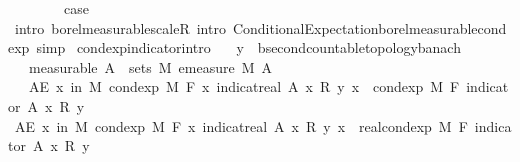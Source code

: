 \begin{isabellebody}
\isanewline
\ \ \isamarkupfalse%
\ {}\isanewline
\ \ \isamarkupfalse%
\ {\isacharquery}{\kern0pt}case\ \isamarkupfalse%
\ {\isacharparenleft}{\kern0pt}intro\ borel{\isacharunderscore}{\kern0pt}measurable{\isacharunderscore}{\kern0pt}scaleR{\isacharcomma}{\kern0pt}\ intro\ Conditional{\isacharunderscore}{\kern0pt}Expectation{\isachardot}{\kern0pt}borel{\isacharunderscore}{\kern0pt}measurable{\isacharunderscore}{\kern0pt}cond{\isacharunderscore}{\kern0pt}exp{\isacharcomma}{\kern0pt}\ simp{\isacharparenright}{\kern0pt}\isanewline
{}\isamarkupfalse%
%
\endisatagproof
{\isafoldproof}%
%
\isadelimproof
\isanewline
%
\endisadelimproof
\isanewline
{}\isamarkupfalse%
\ cond{\isacharunderscore}{\kern0pt}exp{\isacharunderscore}{\kern0pt}indicator{\isacharbrackleft}{\kern0pt}intro{\isacharbrackright}{\kern0pt}{\isacharcolon}{\kern0pt}\isanewline
\ \ \ y\ {\isacharcolon}{\kern0pt}{\isacharcolon}{\kern0pt}\ {\isachardoublequoteopen}{\isacharprime}{\kern0pt}b{\isacharcolon}{\kern0pt}{\isacharcolon}{\kern0pt}{\isacharbraceleft}{\kern0pt}second{\isacharunderscore}{\kern0pt}countable{\isacharunderscore}{\kern0pt}topology{\isacharcomma}{\kern0pt}banach{\isacharbraceright}{\kern0pt}{\isachardoublequoteclose}\isanewline
\ \ \ {\isacharbrackleft}{\kern0pt}measurable{\isacharbrackright}{\kern0pt}{\isacharcolon}{\kern0pt}\ {\isachardoublequoteopen}A\ {\isasymin}\ sets\ M{\isachardoublequoteclose}\ {\isachardoublequoteopen}emeasure\ M\ A\ {\isacharless}{\kern0pt}\ {\isasyminfinity}{\isachardoublequoteclose}\isanewline
\ \ \ {\isachardoublequoteopen}AE\ x\ in\ M{\isachardot}{\kern0pt}\ cond{\isacharunderscore}{\kern0pt}exp\ M\ F\ {\isacharparenleft}{\kern0pt}{\isasymlambda}x{\isachardot}{\kern0pt}\ indicat{\isacharunderscore}{\kern0pt}real\ A\ x\ {\isacharasterisk}{\kern0pt}\isactrlsub R\ y{\isacharparenright}{\kern0pt}\ x\ {\isacharequal}{\kern0pt}\ cond{\isacharunderscore}{\kern0pt}exp\ M\ F\ {\isacharparenleft}{\kern0pt}indicator\ A{\isacharparenright}{\kern0pt}\ x\ {\isacharasterisk}{\kern0pt}\isactrlsub R\ y{\isachardoublequoteclose}\isanewline
%
\isadelimproof
%
\endisadelimproof
%
\isatagproof
{}\isamarkupfalse%
\ {\isacharminus}{\kern0pt}\isanewline
\ \ \isamarkupfalse%
\ {\isachardoublequoteopen}AE\ x\ in\ M{\isachardot}{\kern0pt}\ cond{\isacharunderscore}{\kern0pt}exp\ M\ F\ {\isacharparenleft}{\kern0pt}{\isasymlambda}x{\isachardot}{\kern0pt}\ indicat{\isacharunderscore}{\kern0pt}real\ A\ x\ {\isacharasterisk}{\kern0pt}\isactrlsub R\ y{\isacharparenright}{\kern0pt}\ x\ {\isacharequal}{\kern0pt}\ real{\isacharunderscore}{\kern0pt}cond{\isacharunderscore}{\kern0pt}exp\ M\ F\ {\isacharparenleft}{\kern0pt}indicator\ A{\isacharparenright}{\kern0pt}\ x\ {\isacharasterisk}{\kern0pt}\isactrlsub R\ y{\isachardoublequoteclose}\ \isamarkupfalse%

\end{isabellebody}
